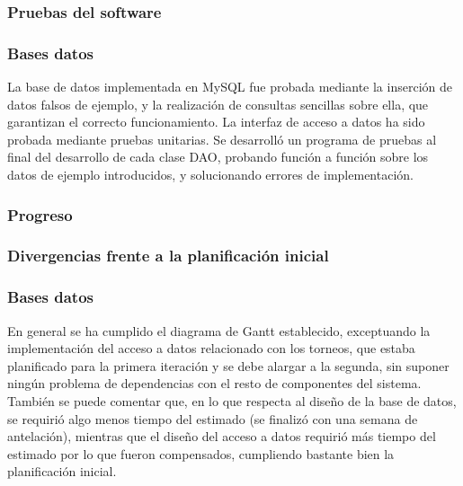 \subsubsection{Pruebas del software}
\subsubsection*{Bases datos}
La base de datos implementada en MySQL fue probada mediante la inserción de datos falsos de ejemplo, y la realización de consultas sencillas sobre ella, que garantizan el correcto funcionamiento. La interfaz de acceso a datos ha sido probada mediante pruebas unitarias. Se desarrolló un programa de pruebas al final del desarrollo de cada clase DAO, probando función a función sobre los datos de ejemplo introducidos, y solucionando errores de implementación.

\subsubsection{Progreso}
\subsubsection*{Divergencias frente a la planificación inicial}
\subsubsection*{Bases datos}
En general se ha cumplido el diagrama de Gantt establecido, exceptuando la implementación del acceso a datos relacionado con los torneos, que estaba planificado para la primera iteración y se debe alargar a la segunda, sin suponer ningún problema de dependencias con el resto de componentes del sistema. También se puede comentar que, en lo que respecta al diseño de la base de datos, se requirió algo menos tiempo del estimado (se finalizó con una semana de antelación), mientras que el diseño del acceso a datos requirió más tiempo del estimado por lo que fueron compensados, cumpliendo bastante bien la planificación inicial.

